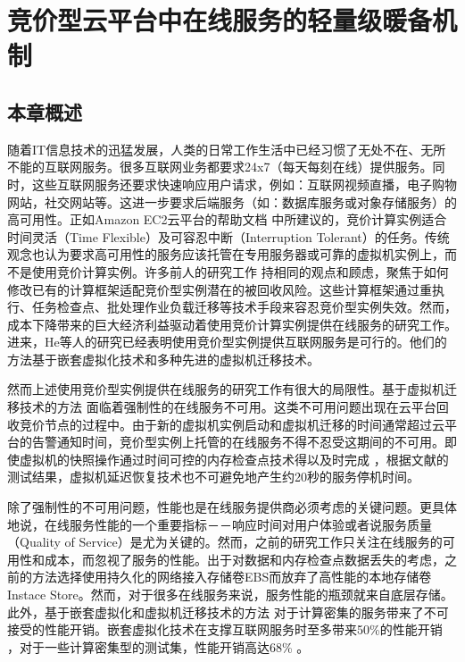 \chapter{竞价型云平台中在线服务的轻量级暖备机制}
\label{cha:gemini}

\section{本章概述}
\label{sec:gemini_intro}
随着IT信息技术的迅猛发展，人类的日常工作生活中已经习惯了无处不在、无所不能的互联网服务。很多互联网业务都要求24x7（每天每刻在线）提供服务。同时，这些互联网服务还要求快速响应用户请求，例如：互联网视频直播，电子购物网站，社交网站等。这进一步要求后端服务（如：数据库服务或对象存储服务）的高可用性。正如Amazon EC2云平台的帮助文档 \cite{SI:2014} 中所建议的，竞价计算实例适合时间灵活（Time Flexible）及可容忍中断（Interruption Tolerant）的任务。传统观念也认为要求高可用性的服务应该托管在专用服务器或可靠的虚拟机实例上，而不是使用竞价计算实例。许多前人的研究工作 \cite{chohan2010see, Liu:2011:CMC:2170444.2170450, song2012optimal, Yi:2010:RCS:1844768.1845343, Andrzejak:2010:DMC:1906481.1906533} 持相同的观点和顾虑，聚焦于如何修改已有的计算框架适配竞价型实例潜在的被回收风险。这些计算框架通过重执行、任务检查点、批处理作业负载迁移等技术手段来容忍竞价型实例失效。然而，成本下降带来的巨大经济利益驱动着使用竞价计算实例提供在线服务的研究工作。进来，He等人的研究已经表明使用竞价型实例提供互联网服务是可行的。他们的方法基于嵌套虚拟化技术和多种先进的虚拟机迁移技术。

然而上述使用竞价型实例提供在线服务的研究工作有很大的局限性。基于虚拟机迁移技术的方法 \cite{He:2015:CCH:2749246.2749275} 面临着强制性的在线服务不可用。这类不可用问题出现在云平台回收竞价节点的过程中。由于新的虚拟机实例启动和虚拟机迁移的时间通常超过云平台的告警通知时间，竞价型实例上托管的在线服务不得不忍受这期间的不可用。即使虚拟机的快照操作通过时间可控的内存检查点技术得以及时完成 \cite{Singh:2013:YEG:2482626.2482642}，根据文献\cite{Hines:2009:PBL:1508293.1508301}的测试结果，虚拟机延迟恢复技术也不可避免地产生约20秒的服务停机时间。

除了强制性的不可用问题，性能也是在线服务提供商必须考虑的关键问题。更具体地说，在线服务性能的一个重要指标－－响应时间对用户体验或者说服务质量（Quality of Service）是尤为关键的。然而，之前的研究工作只关注在线服务的可用性和成本，而忽视了服务的性能。出于对数据和内存检查点数据丢失的考虑，之前的方法选择使用持久化的网络接入存储卷EBS而放弃了高性能的本地存储卷Instace Store。然而，对于很多在线服务来说，服务性能的瓶颈就来自底层存储。此外，基于嵌套虚拟化和虚拟机迁移技术的方法 \cite{He:2015:CCH:2749246.2749275} 对于计算密集的服务带来了不可接受的性能开销。嵌套虚拟化技术在支撑互联网服务时至多带来50\%的性能开销 \cite{He:2015:CCH:2749246.2749275}，对于一些计算密集型的测试集，性能开销高达68\% \cite{Williams:2012:XVO:2168836.2168849}。

